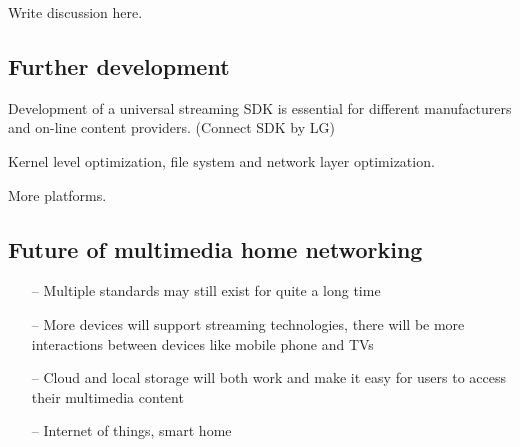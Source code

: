 
Write discussion here.

\subsection{Further development}
Development of a universal streaming SDK is essential for different
manufacturers and on-line content providers. (Connect SDK by LG)

Kernel level optimization, file system and network layer optimization.

More platforms.
\subsection{Future of multimedia home networking}
\begin{itemize}
\item[--] Multiple standards may still exist for quite a long time
\item[--] More devices will support streaming technologies, there will be more interactions between devices like mobile phone and TVs
\item[--] Cloud and local storage will both work and make it easy for users to access their multimedia content
\item[--] Internet of things, smart home
\end{itemize}